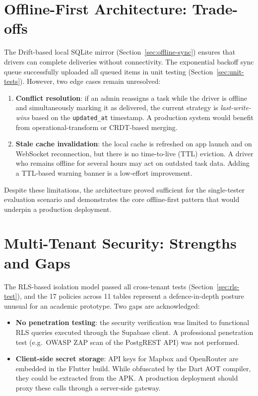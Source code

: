 \section{Offline-First Architecture: Trade-offs}
\label{sec:disc-offline}

The Drift-based local SQLite mirror (Section~\ref{sec:offline-sync}) ensures
that drivers can complete deliveries without connectivity.  The exponential
backoff sync queue successfully uploaded all queued items in unit testing
(Section~\ref{sec:unit-tests}).  However, two edge cases remain unresolved:

\begin{enumerate}
  \item \textbf{Conflict resolution}: if an admin reassigns a task while the
        driver is offline and simultaneously marking it as delivered, the
        current strategy is \emph{last-write-wins} based on the
        \texttt{updated\_at} timestamp.  A production system would benefit
        from operational-transform or CRDT-based merging.
  \item \textbf{Stale cache invalidation}: the local cache is refreshed on
        app launch and on WebSocket reconnection, but there is no
        time-to-live (TTL) eviction.  A driver who remains offline for
        several hours may act on outdated task data.  Adding a TTL-based
        warning banner is a low-effort improvement.
\end{enumerate}

Despite these limitations, the architecture proved sufficient for the
single-tester evaluation scenario and demonstrates the core offline-first
pattern that would underpin a production deployment.

\section{Multi-Tenant Security: Strengths and Gaps}
\label{sec:disc-security}

The RLS-based isolation model passed all cross-tenant tests
(Section~\ref{sec:rls-test}), and the 17 policies across 11 tables
represent a defence-in-depth posture unusual for an academic prototype.
Two gaps are acknowledged:

\begin{itemize}
  \item \textbf{No penetration testing}: the security verification was
        limited to functional RLS queries executed through the Supabase
        client.  A professional penetration test (e.g.\ OWASP ZAP scan of
        the PostgREST API) was not performed.
  \item \textbf{Client-side secret storage}: API keys for Mapbox and
        OpenRouter are embedded in the Flutter build.  While obfuscated by
        the Dart AOT compiler, they could be extracted from the APK.  A
        production deployment should proxy these calls through a
        server-side gateway.
\end{itemize}

